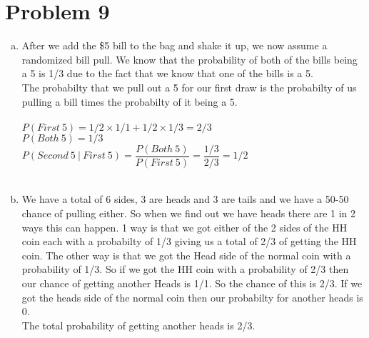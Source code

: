 \documentclass[11pt,letterpaper]{article}
\begin{document}
\section*{Problem 9}
\begin{enumerate}[(a)]
\item
After we add the \$5 bill to the bag and shake it up, we now assume a randomized bill pull. We know that the probability of both of the bills being a 5 is 1/3 due to the fact that we know that one of the bills is a 5.\\
The probabilty that we pull out a 5 for our first draw is the probabilty of us pulling a bill times the probabilty of it being a 5.\\\\
$P(First~5) = 1/2\times1/1 + 1/2\times1/3 = 2/3$\\
$P(Both~5) = 1/3$\\
$P(Second~5 ~|~First~5) = \dfrac{P(Both~5)}{P(First~5)} = \dfrac{1/3}{2/3} = 1/2$\\\\
\item
We have a total of 6 sides, 3 are heads and 3 are tails and we have a 50-50 chance of pulling either. So when we find out we have heads there are 1 in 2 ways this can happen. 1 way is that we got either of the 2 sides of the HH coin each with a probabilty of 1/3 giving us a total of 2/3 of getting the HH coin. The other way is that we got the Head side of the normal coin with a probability of 1/3. So if we got the HH coin with a probability of 2/3 then our chance of getting another Heads is 1/1. So the chance of this is 2/3. If we got the heads side of the normal coin then our probabilty for another heads is 0.\\
The total probability of getting another heads is 2/3.
\end{enumerate}
\end{document}
